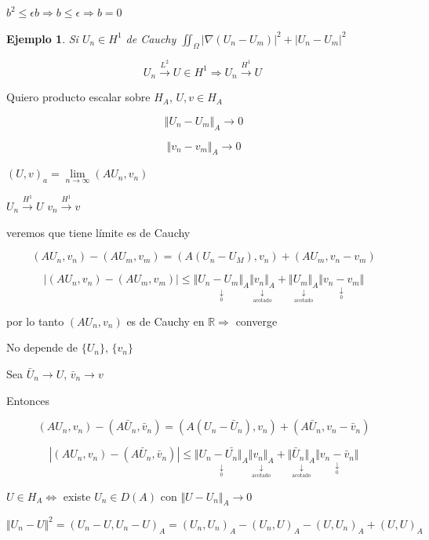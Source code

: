 \documentclass[a4paper,10pt]{book}
\def \ep{\epsilon}
\newtheorem{ejemplo}{Ejemplo}
\begin{document}
$b^2\leq \ep b \Rightarrow b\leq \ep \Rightarrow b=0$ 

\begin{ejemplo}
    Si $U_n\in H^1$ de Cauchy $\iint_\Omega |\nabla (U_n-U_m)|^2 + |U_n-U_m|^2 $

    \[
    U_n\overset{L^2}{ \rightarrow } U \in H^1 \Rightarrow U_n\overset{H^1}{ \rightarrow } U   \
    \]
\end{ejemplo}

Quiero producto escalar sobre $H_A$, $U,v\in H_A$

\[
\Vert U_n -U_m\Vert_A\rightarrow 0 
\]

\[
\Vert v_n -v_m \Vert_A \rightarrow 0
\]

$(U,v)_a=\underset{n\rightarrow\infty}{\lim} (AU_n,v_n)$

$U_n \overset{H^1}{ \rightarrow } U  $
$v_n \overset{H^1}{ \rightarrow } v  $

veremos que tiene límite es de Cauchy

\[(AU_n,v_n) - (AU_m,v_m) = (A(U_n-U_M),v_n)+(AU_m,v_n-v_m)\]



\[ |(AU_n,v_n) - (AU_m,v_m)| \leq \underset{\underset{0}{\downarrow} }{\Vert U_n-U_m\Vert_A } \underset{\underset{\text{acotado}}{\downarrow}}{{\Vert v_n\Vert_A }}+\underset{\underset{\text{acotado}}{\downarrow}}{\Vert U_m\Vert_A} \underset{\underset{0}{\downarrow}}{\Vert v_n-v_m\Vert}  \]

por lo tanto $(AU_n,v_n)$ es de Cauchy en $\mathbb{R} \Rightarrow$ converge

No depende de $\{U_n\}$, $\{v_n\}$

Sea $\bar{U}_n\rightarrow U$, $\bar{v}_n\rightarrow v$

Entonces

\[
(AU_n ,v_n)- (A\bar{U}_n ,\bar{v}_n) = (A (U_n-\bar{U}_n ),v_n) + (A \bar{U}_n,v_n - \bar{v}_n)
\]

\[ |(AU_n,v_n) - (A\bar{U}_n,\bar{v}_n)| \leq \underset{\underset{0}{\downarrow} }{\Vert U_n-\bar{U_n}\Vert_A } \underset{\underset{\text{acotado}}{\downarrow}}{{\Vert v_n\Vert_A }}+\underset{\underset{\text{acotado}}{\downarrow}}{\Vert \bar{U}_n\Vert_A} \underset{\underset{0}{\downarrow}}{\Vert v_n-\bar{v}_n\Vert}  \]

$U\in H_A \Leftrightarrow$ existe $U_n\in D(A) $ con $\Vert U -U_n \Vert_A\rightarrow 0$

\[
\Vert U_n -U\Vert^2 = ( U_n -U, U_n -U)_A = (U_n,U_n)_A - (U_n,U)_A-(U,U_n)_A+(U,U)_A
\]
\end{document}
